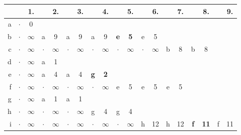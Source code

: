 \documentclass{article}
\begin{document}
\begin{center}
\begin{tabular}{|r||c@{\,}c|c@{\,}c|c@{\,}c|c@{\,}c|c@{\,}c|c@{\,}c|c@{\,}c|c@{\,}c|c@{\,}c|}
\hline
 & & 1. & & 2. & & 3. & & 4. & & 5. & & 6. & & 7. & & 8. & & 9.\\
\hline
a & $\cdot$ & 0 & &  & &  & &  & &  & &  & &  & &  & & \\
\hline
b & $\cdot$ & $\infty$ & a & 9 & a & 9 & a & 9 & \textbf{e} & \textbf{5} & e & 5 & &  & &  & & \\
\hline
c & $\cdot$ & $\infty$ & $\cdot$ & $\infty$ & $\cdot$ & $\infty$ & $\cdot$ & $\infty$ & $\cdot$ & $\infty$ & $\cdot$ & $\infty$ & b & 8 & b & 8 & & \\
\hline
d & $\cdot$ & $\infty$ & a & 1 & &  & &  & &  & &  & &  & &  & & \\
\hline
e & $\cdot$ & $\infty$ & a & 4 & a & 4 & \textbf{g} & \textbf{2} & &  & &  & &  & &  & & \\
\hline
f & $\cdot$ & $\infty$ & $\cdot$ & $\infty$ & $\cdot$ & $\infty$ & $\cdot$ & $\infty$ & e & 5 & e & 5 & e & 5 & &  & & \\
\hline
g & $\cdot$ & $\infty$ & a & 1 & a & 1 & &  & &  & &  & &  & &  & & \\
\hline
h & $\cdot$ & $\infty$ & $\cdot$ & $\infty$ & $\cdot$ & $\infty$ & g & 4 & g & 4 & &  & &  & &  & & \\
\hline
i & $\cdot$ & $\infty$ & $\cdot$ & $\infty$ & $\cdot$ & $\infty$ & $\cdot$ & $\infty$ & $\cdot$ & $\infty$ & h & 12 & h & 12 & \textbf{f} & \textbf{11} & f & 11\\
\hline
\end{tabular}
\end{center}
\end{document}
